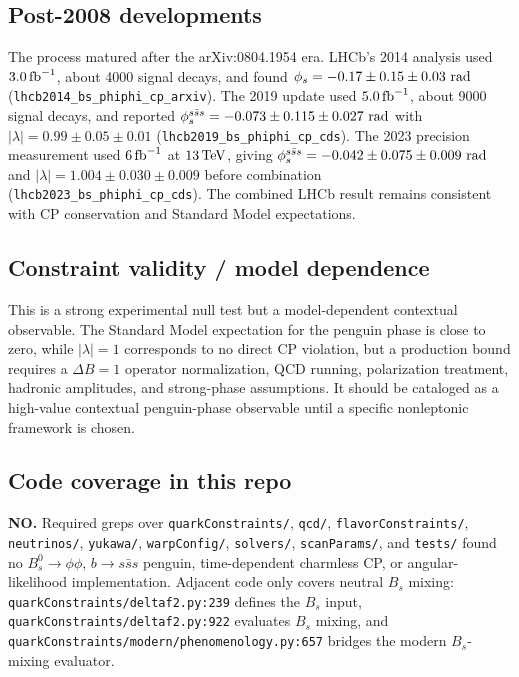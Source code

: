 \subsection*{Post-2008 developments}
The process matured after the arXiv:0804.1954 era.  LHCb's 2014 analysis used
\(3.0\,{\rm fb}^{-1}\), about 4000 signal decays, and found
\(\phi_s=-0.17\pm0.15\pm0.03\ {\rm rad}\)
(\texttt{lhcb2014\_bs\_phiphi\_cp\_arxiv}).  The 2019 update used
\(5.0\,{\rm fb}^{-1}\), about 9000 signal decays, and reported
\(\phi_s^{s\bar{s}s}=-0.073\pm0.115\pm0.027\ {\rm rad}\) with
\(|\lambda|=0.99\pm0.05\pm0.01\)
(\texttt{lhcb2019\_bs\_phiphi\_cp\_cds}).  The 2023 precision measurement used
\(6\,{\rm fb}^{-1}\) at \(13\,{\rm TeV}\), giving
\(\phi_s^{s\bar{s}s}=-0.042\pm0.075\pm0.009\ {\rm rad}\) and
\(|\lambda|=1.004\pm0.030\pm0.009\) before combination
(\texttt{lhcb2023\_bs\_phiphi\_cp\_cds}).  The combined LHCb result remains
consistent with CP conservation and Standard Model expectations.

\subsection*{Constraint validity / model dependence}
This is a strong experimental null test but a model-dependent contextual observable.
The Standard Model expectation for the penguin phase is close to zero, while
\(|\lambda|=1\) corresponds to no direct CP violation, but a production bound
requires a \(\Delta B=1\) operator normalization, QCD running, polarization
treatment, hadronic amplitudes, and strong-phase assumptions.  It should be
cataloged as a high-value contextual penguin-phase observable until a specific
nonleptonic framework is chosen.

\subsection*{Code coverage in this repo}
\textbf{NO.}  Required greps over \texttt{quarkConstraints/}, \texttt{qcd/},
\texttt{flavorConstraints/}, \texttt{neutrinos/}, \texttt{yukawa/},
\texttt{warpConfig/}, \texttt{solvers/}, \texttt{scanParams/}, and
\texttt{tests/} found no \(B_s^0\to\phi\phi\), \(b\to s\bar{s}s\) penguin,
time-dependent charmless CP, or angular-likelihood implementation.  Adjacent
code only covers neutral \(B_s\) mixing: \texttt{quarkConstraints/deltaf2.py:239}
defines the \(B_s\) input, \texttt{quarkConstraints/deltaf2.py:922} evaluates
\(B_s\) mixing, and \texttt{quarkConstraints/modern/phenomenology.py:657}
bridges the modern \(B_s\)-mixing evaluator.

